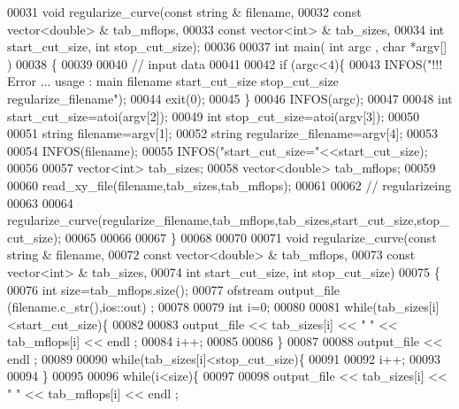 \begin{DoxyCode}
00031 \textcolor{keywordtype}{void} regularize\_curve(\textcolor{keyword}{const} \textcolor{keywordtype}{string} & filename,
00032               \textcolor{keyword}{const} vector<double> & tab\_mflops, 
00033               \textcolor{keyword}{const} vector<int> & tab\_sizes, 
00034               \textcolor{keywordtype}{int} start\_cut\_size, \textcolor{keywordtype}{int} stop\_cut\_size);
00036 
00037 \textcolor{keywordtype}{int} main( \textcolor{keywordtype}{int} argc , \textcolor{keywordtype}{char} *argv[] )
00038 \{
00039 
00040   \textcolor{comment}{// input data}
00041 
00042   \textcolor{keywordflow}{if} (argc<4)\{
00043     INFOS(\textcolor{stringliteral}{"!!! Error ... usage : main filename start\_cut\_size stop\_cut\_size regularize\_filename"});
00044     exit(0);
00045   \}
00046   INFOS(argc);
00047 
00048   \textcolor{keywordtype}{int} start\_cut\_size=atoi(argv[2]);
00049   \textcolor{keywordtype}{int} stop\_cut\_size=atoi(argv[3]);
00050 
00051   \textcolor{keywordtype}{string} filename=argv[1];
00052   \textcolor{keywordtype}{string} regularize\_filename=argv[4];
00053   
00054   INFOS(filename);
00055   INFOS(\textcolor{stringliteral}{"start\_cut\_size="}<<start\_cut\_size);
00056 
00057   vector<int> tab\_sizes;
00058   vector<double> tab\_mflops;
00059 
00060   read\_xy\_file(filename,tab\_sizes,tab\_mflops);
00061 
00062   \textcolor{comment}{// regularizeing}
00063 
00064   regularize\_curve(regularize\_filename,tab\_mflops,tab\_sizes,start\_cut\_size,stop\_cut\_size);
00065   
00066 
00067 \}
00068 
00070 
00071 \textcolor{keywordtype}{void} regularize\_curve(\textcolor{keyword}{const} \textcolor{keywordtype}{string} & filename,
00072               \textcolor{keyword}{const} vector<double> & tab\_mflops, 
00073               \textcolor{keyword}{const} vector<int> & tab\_sizes, 
00074               \textcolor{keywordtype}{int} start\_cut\_size, \textcolor{keywordtype}{int} stop\_cut\_size)
00075 \{
00076   \textcolor{keywordtype}{int} size=tab\_mflops.size();
00077   ofstream output\_file (filename.c\_str(),ios::out) ;
00078 
00079   \textcolor{keywordtype}{int} i=0;
00080 
00081   \textcolor{keywordflow}{while}(tab\_sizes[i]<start\_cut\_size)\{
00082     
00083     output\_file << tab\_sizes[i] << \textcolor{stringliteral}{" "} <<  tab\_mflops[i] << endl ;
00084     i++;
00085 
00086   \}
00087     
00088   output\_file << endl ;
00089 
00090   \textcolor{keywordflow}{while}(tab\_sizes[i]<stop\_cut\_size)\{
00091     
00092     i++;
00093 
00094   \}
00095 
00096   \textcolor{keywordflow}{while}(i<size)\{
00097     
00098     output\_file << tab\_sizes[i] << \textcolor{stringliteral}{" "} <<  tab\_mflops[i] << endl ;

\end{DoxyCode}
